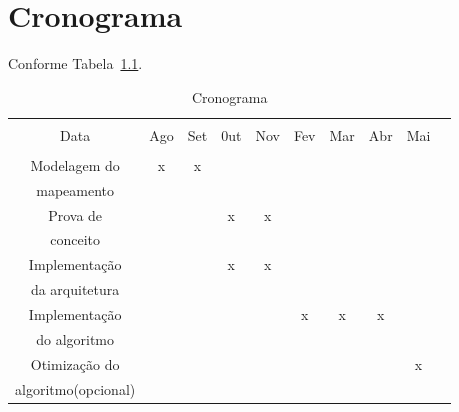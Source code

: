 \chapter{Cronograma}\label{cap:cronograma}

Conforme Tabela~\ref{tab:crono}.
\begin{table}[Ht!]
   \begin{center}
     \begin{tabular}{|c|c|c|c|c|c|c|c|c|c|}
       \hline
                         &      &     &     &     &     &     &     &         \\
           Data          &  Ago & Set & 0ut & Nov & Fev & Mar & Abr & Mai      \\
                         &      &     &     &     &     &     &     &         \\
       \hline                                                                 
       Modelagem do      &   x  &  x  &     &     &     &     &     &         \\
       mapeamento        &      &     &     &     &     &     &     &         \\
       \hline                                                                 
       Prova de          &      &     &  x  &  x  &     &     &     &         \\
       conceito          &      &     &     &     &     &     &     &         \\
       \hline                                                                 
       Implementação     &      &     &  x  &  x  &     &     &     &         \\
       da arquitetura    &      &     &     &     &     &     &     &         \\
       \hline                                                                 
       Implementação     &      &     &     &     &  x  &  x  &  x  &         \\
       do algoritmo      &      &     &     &     &     &     &     &         \\
       \hline                                                                 
       Otimização do     &      &     &     &     &     &     &     &   x     \\
       algoritmo(opcional)&      &     &     &     &     &     &     &         \\
       \hline
     \end{tabular}
   \caption{Cronograma}
   \label{tab:crono}
   \end{center}
 \end{table}

